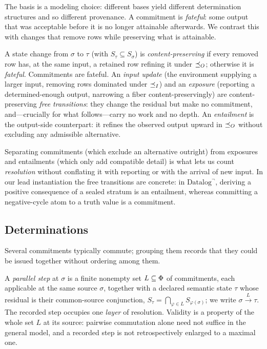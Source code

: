 \noindent
The basis is a modeling choice: different bases yield different determination
structures and so different provenance. A commitment
is \emph{fateful}: some output that was acceptable before it is
no longer attainable afterwards. We contrast this with changes that remove
rows while preserving what is attainable.

\begin{definition}
  \label{def:free}
  A state change from $\sigma$ to $\tau$ (with $S_\tau \subseteq S_\sigma$) is
  \emph{content-preserving} if every removed row has, at the same input, a
  retained row refining it under $\preceq_O$; otherwise it is \emph{fateful}.
  Commitments are fateful. An \emph{input update} (the environment supplying a
  larger input, removing rows dominated under $\preceq_I$) and an \emph{exposure}
  (reporting a determined-enough output, narrowing a fiber content-preservingly)
  are content-preserving \emph{free transitions}: they change the residual but
  make no commitment, and---crucially for what follows---carry no work and no
  depth. An \emph{entailment} is the output-side counterpart: it refines the
  observed output upward in $\preceq_O$ without excluding any admissible
  alternative.
\end{definition}

\noindent
Separating commitments (which exclude an alternative outright) from exposures
and entailments (which only add compatible detail) is what lets us count
\emph{resolution} without conflating it with reporting or with the arrival of
new input. In our lead instantiation the free transitions are concrete: in
$\mbox{Datalog}^\neg$, deriving a positive consequence of a sealed stratum is
an entailment, whereas committing a negative-cycle atom to a truth value is a
commitment.

\subsection{Determinations}

Several commitments typically commute; grouping them records that they could
be issued together without ordering among them.

\begin{definition}
  \label{def:parallel-step}
  A \emph{parallel step} at $\sigma$ is a finite nonempty set
  $L \subseteq \Phi$ of commitments, each applicable at the same source
  $\sigma$, together with a declared semantic state $\tau$ whose residual is
  their common-source conjunction,
  $S_\tau = \bigcap_{\varphi\in L} S_{\varphi(\sigma)}$; we write
  $\sigma \xrightarrow{L} \tau$. The recorded step occupies one
  \emph{layer} of resolution. Validity is a property of the whole set $L$ at
  its source: pairwise commutation alone need not suffice in the general
  model, and a recorded step is not retrospectively enlarged to a maximal
  one.
\end{definition}

